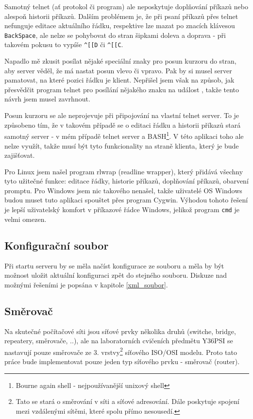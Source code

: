 Samotný telnet (ať protokol či program) ale neposkytuje doplňování příkazů nebo alespoň historii příkazů. Dalším problémem je, že při psaní příkazů přes telnet nefunguje editace aktuálního řádku, respektive lze mazat po znacích klávesou \verb|BackSpace|, ale nelze se pohybovat do stran šipkami doleva a doprava - při takovém pokusu to vypíše \verb|^[[D| či \verb|^[[C|. 

Napadlo mě zkusit posílat nějaké speciální znaky pro posun kurzoru do stran, aby server věděl, že má nastat posun vlevo či vpravo. Pak by si musel server pamatovat, na které pozici řádku je klient. Nepřišel jsem však na způsob, jak přesvědčit program telnet pro posílání nějakého znaku na událost , takže tento návrh jsem musel zavrhnout.

Posun kurzoru se ale neprojevuje při připojování na vlastní telnet server. To je způsobeno tím, že v takovém případě se o editaci řádku a historii příkazů stará samotný server - v mém případě telnet server a BASH\footnote{Bourne again shell - nejpoužívanější unixový shell}. V této aplikaci toho ale nelze využít, takže musí být tyto funkcionality na straně klienta, který je bude zajišťovat. 

Pro Linux jsem našel program rlwrap (readline wrapper), který přidává všechny tyto užitečné funkce: editace řádky, historie příkazů, doplňování příkazů, obarvení promptu. Pro Windows jsem nic takového nenašel, takže uživatelé OS Windows budou muset tuto aplikaci spouštet přes program Cygwin. Výhodou tohoto řešení je lepší uživatelský komfort v příkazové řádce Windows, jelikož program \verb|cmd| je velmi omezen.


\subsection{Konfigurační soubor}
Při startu serveru by se měla načíst konfigurace ze souboru a měla by být možnost uložit aktuální konfiguraci zpět do stejného souboru. Diskuze nad možnými řešeními je popsána v kapitole \ref{xml_soubor}.


\subsection{Směrovač}
Na skutečné počítačové síti jsou síťové prvky několika druhů (switche, bridge, repeatery, směrovače, ..), ale na laboratorních cvičeních předmětu Y36PSI se  nastavují pouze směrovače ze 3. vrstvy\footnote{Tato  se stará o směrování v síti a síťové adresování. Dále poskytuje spojení mezi vzdálenými sítěmi, které spolu přímo nesousedí.} síťového ISO/OSI modelu. Proto tato práce bude implementovat pouze jeden typ síťového prvku - směrovač (router). 

